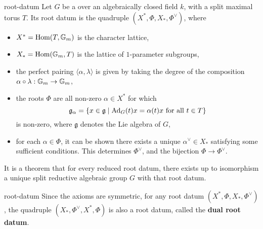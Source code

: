 \begin{example}{root-datum}
    Let $G$ be a  over an algebraically closed field $k$, with a split maximal torus $T$. Its root datum is the quadruple $(X^*, \Phi, X_*, \Phi^\vee)$, where
    \begin{itemize}
        \item $X^* = \operatorname{Hom}(T, \mathbb{G}_m)$ is the character lattice,
        \item $X_* = \operatorname{Hom}(\mathbb{G}_m, T)$ is the lattice of $1$-parameter subgroups,
        \item the perfect pairing $\langle \alpha, \lambda \rangle$ is given by taking the degree of the composition $\alpha \circ \lambda : \mathbb{G}_m \to \mathbb{G}_m$,
        \item the roots $\Phi$ are all non-zero $\alpha \in X^*$ for which
        \[ \mathfrak{g}_\alpha = \{ x \in \mathfrak{g} \mid \textup{Ad}_G(t) x = \alpha(t) x \textup{ for all } t \in T \} \]
        is non-zero, where $\mathfrak{g}$ denotes the Lie algebra of $G$,
        \item for each $\alpha \in \Phi$, it can be shown there exists a unique $\alpha^\vee \in X_*$ satisfying some sufficient conditions. This determines $\Phi^\vee$, and the bijection $\Phi \to \Phi^\vee$.
    \end{itemize}
    It is a theorem that for every reduced root datum, there exists up to isomorphism a unique split reductive algebraic group $G$ with that root datum.
\end{example}

\begin{example}{root-datum}
    Since the axioms are symmetric, for any root datum $(X^*, \Phi, X_*, \Phi^\vee)$, the quadruple $(X_*, \Phi^\vee, X^*, \Phi)$ is also a root datum, called the \textbf{dual root datum}.
\end{example}

